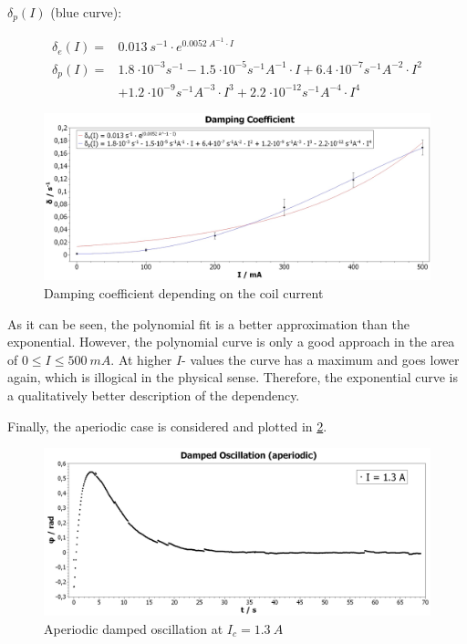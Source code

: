         $ \delta_p(I) $ (blue curve):\par
        \begin{align}
            \delta_e(I)=&\SI{0.013}{s^{-1}}\cdot e^{\SI{0.0052}{A^{-1}}\cdot I}\\
            \delta_p(I)=&\SI{1.8}{\cdot 10^{-3}s^{-1}} - \SI{1.5}{\cdot 10^{-5}s^{-1}A^{-1}}\cdot I + \SI{6.4}{\cdot 10^{-7}s^{-1}A^{-2}}\cdot I^2 \nonumber\\
                        &+ \SI{1.2}{\cdot 10^{-9}s^{-1}A^{-3}}\cdot I^3 + \SI{2.2}{\cdot 10^{-12}s^{-1}A^{-4}}\cdot I^4
        \end{align}
        \begin{figure}
            \centering
            \includegraphics[width=1\linewidth]{"messdaten/Damping Coefficient"}
            \caption[Damping coefficient depending on the coil current]{Damping coefficient depending on the coil current}
            \label{fig:damping-coefficient}
        \end{figure}
        As it can be seen, the polynomial fit is a better approximation than the exponential. However, the polynomial curve
        is only a good approach in the area of $ 0 \leq I \leq \SI{500}{mA} $. At higher $ I $- values the curve has a maximum
        and goes lower again, which is illogical in the physical sense. Therefore, the exponential curve is a qualitatively
        better description of the dependency.\par\medskip
        Finally, the aperiodic case is considered and plotted in \cref{fig:damped-oscillation-aperiodic}.\par
        \begin{figure}
            \centering
            \includegraphics[width=1\linewidth]{"messdaten/Damped Oscillation (aperiodic)"}
            \caption[Aperiodic damped oscillation at $ I_c=\SI{1.3}{A} $]{Aperiodic damped oscillation at $ I_c=\SI{1.3}{A} $}
            \label{fig:damped-oscillation-aperiodic}
        \end{figure}
